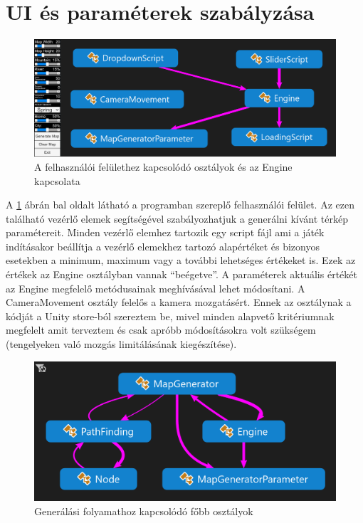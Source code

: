 \newpage
\section{UI és paraméterek szabályzása}

\begin{figure}[h!]
\centering
\includegraphics[scale=0.37]{kepek/UI.png}
\caption{A felhasználói felülethez kapcsolódó osztályok és az Engine kapcsolata}
\label{fig:UI}
\end{figure}

\noindent A \ref{fig:UI} ábrán bal oldalt látható a programban szereplő felhasználói felület. Az ezen található vezérlő elemek segítségével szabályozhatjuk a generálni kívánt térkép paramétereit. Minden vezérlő elemhez tartozik egy script fájl ami a játék indításakor beállítja a vezérlő elemekhez tartozó alapértéket és bizonyos esetekben a minimum, maximum vagy a további lehetséges értékeket is. Ezek az értékek az Engine osztályban vannak “beégetve”. A paraméterek aktuális értékét az Engine megfelelő metódusainak meghívásával lehet módosítani.
\newline
\newline A CameraMovement osztály felelős a kamera mozgatásért. Ennek az osztálynak a kódját a Unity store-ból szereztem be, mivel minden alapvető kritériumnak megfelelt amit terveztem és csak apróbb módosításokra volt szükségem (tengelyeken való mozgás limitálásának kiegészítése). 

\begin{figure}[h!]
\centering
\includegraphics[scale=0.4]{kepek/generalas.png}
\caption{Generálási folyamathoz kapcsolódó főbb osztályok}
\label{fig:generalas}
\end{figure}

